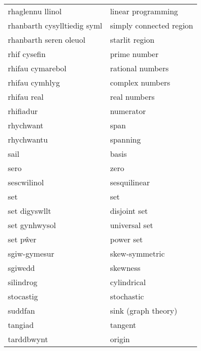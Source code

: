 \begin{supertabular}{p{0.22\textwidth}p{0.22\textwidth}}
               rhaglennu llinol &               linear programming \\
    rhanbarth cysylltiedig syml &          simply connected region \\
         rhanbarth seren oleuol &                   starlit region \\
                   rhif cysefin &                     prime number \\
               rhifau cymarebol &                 rational numbers \\
                 rhifau cymhlyg &                  complex numbers \\
                    rhifau real &                     real numbers \\
                      rhifiadur &                        numerator \\
                      rhychwant &                             span \\
                     rhychwantu &                         spanning \\
                           sail &                            basis \\
                           sero &                             zero \\
                    sescwilinol &                     sesquilinear \\
                            set &                              set \\
                  set digyswllt &                     disjoint set \\
                  set gynhwysol &                    universal set \\
                       set pŵer &                        power set \\
                   sgiw-gymesur &                   skew-symmetric \\
                        sgiwedd &                         skewness \\
                      silindrog &                      cylindrical \\
                      stocastig &                       stochastic \\
                        suddfan &              sink (graph theory) \\
                        tangiad &                          tangent \\
                     tarddbwynt &                           origin \\

\end{supertabular}
